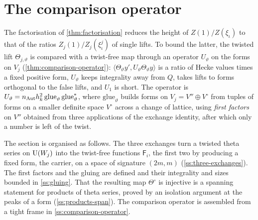 \section{The comparison operator}\label{sec:comparison}

The factorisation of \cref{thm:factorisation} reduces the height of $Z(1)/Z(\xi_\iota)$ to that of the ratios $Z_j(1)/Z_j(\xi^j_\iota)$ of single lifts. To bound the latter, the
twisted lift $\Theta_{j,\vartheta}$ is compared with a twist-free map through an operator $U_\vartheta$ on the forms on $V_j$ (\cref{thm:comparison-operator}):
$\langle\Theta_\vartheta y',U_\vartheta\Theta_\vartheta y\rangle$ is a ratio of Hecke values times a fixed positive form, $U_\vartheta$ keeps integrality away from $Q$, takes lifts to forms orthogonal to the
false lifts, and $U_1$ is short. The operator is $U_\vartheta=n_{\rm Aut}h_k^2\,\mathrm{glue}_\vartheta\,\mathrm{glue}_\vartheta^*$, where $\mathrm{glue}_\vartheta$ builds forms on $V_j=V''\oplus V^\circ$ from tuples of forms on a
smaller definite space $V^\circ$ across a change of lattice, using \emph{first factors} on $V''$ obtained from three applications of the exchange identity, after which only a
number is left of the twist.

The section is organised as follows. The three exchanges turn a twisted theta series on $\operatorname{U}(W_j)$ into the twist-free functions $\mathsf F_i$, the first two by producing a fixed form, the carrier, on a space of
signature $(2m,m)$ (\cref{ss:three-exchanges}). The first factors and the gluing are defined and their integrality and sizes bounded in \cref{ss:gluing}. That the resulting map $\Theta^\circ$ is injective is a spanning
statement for products of theta series, proved by an isolation argument at the peaks of a form (\cref{ss:products-span}). The comparison operator is assembled from a tight frame in \cref{ss:comparison-operator}.

